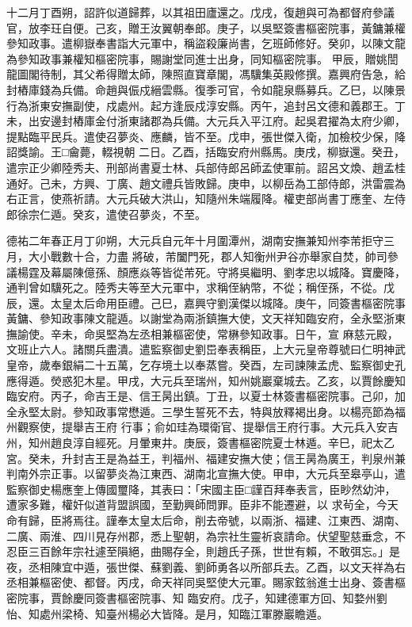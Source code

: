 \begin{pinyinscope}
 十二月丁酉朔，詔許似道歸葬，以其祖田廬還之。戊戌，復趙與可為都督府參議官，放李玨自便。己亥，贈王汝翼朝奉郎。庚子，以吳堅簽書樞密院事，黃鏞兼權參知政事。遣柳嶽奉書詣大元軍中，稱盜殺廉尚書，乞班師修好。癸卯，以陳文龍為參知政事兼權知樞密院事，賜謝堂同進士出身，同知樞密院事。
 甲辰，贈姚誾龍圖閣待制，其父希得贈太師，陳照直寶章閣，馮驥集英殿修撰。嘉興府告急，給封樁庫錢為兵備。命趙與侲戍縉雲縣。復季可官，令如龍泉縣募兵。乙巳，以陳景行為浙東安撫副使，戍處州。起方逢辰戍淳安縣。丙午，追封呂文德和義郡王。丁未，出安邊封樁庫金付浙東諸郡為兵備。大元兵入平江府。起吳君擢為太府少卿，提點臨平民兵。遣使召夢炎、應麟，皆不至。戊申，張世傑入衛，加檢校少保，降詔獎諭。王□龠薨，輟視朝
 二日。乙酉，括臨安府州縣馬。庚戌，柳嶽還。癸丑，遣宗正少卿陸秀夫、刑部尚書夏士林、兵部侍郎呂師孟使軍前。詔呂文煥、趙孟桂通好。己未，方興、丁廣、趙文禮兵皆敗歸。庚申，以柳岳為工部侍郎，洪雷震為右正言，使燕祈請。大元兵破大洪山，知隨州朱端履降。權吏部尚書丁應奎、左侍郎徐宗仁遁。癸亥，遣使召夢炎，不至。



 德祐二年春正月丁卯朔，大元兵自元年十月圍潭州，湖南安撫兼知州李芾拒守三月，大小戰數十合，力盡
 將破，芾闔門死，郡人知衡州尹谷亦舉家自焚，帥司參議楊霆及幕屬陳億孫、顏應焱等皆從芾死。守將吳繼明、劉孝忠以城降。寶慶降，通判曾如驥死之。陸秀夫等至大元軍中，求稱侄納幣，不從；稱侄孫，不從。戊辰，還。太皇太后命用臣禮。己巳，嘉興守劉漢傑以城降。庚午，同簽書樞密院事黃鏞、參知政事陳文龍遁。以謝堂為兩浙鎮撫大使，文天祥知臨安府，全永堅浙東撫諭使。辛未，命吳堅為左丞相兼樞密使，常楙參知政事。日午，宣
 麻慈元殿，文班止六人。諸關兵盡潰。遣監察御史劉岊奉表稱臣，上大元皇帝尊號曰仁明神武皇帝，歲奉銀絹二十五萬，乞存境土以奉蒸嘗。癸酉，左司諫陳孟虎、監察御史孔應得遁。熒惑犯木星。甲戌，大元兵至瑞州，知州姚巖棄城去。乙亥，以賈餘慶知臨安府。丙子，命吉王是、信王昺出鎮。丁丑，以夏士林簽書樞密院事。己卯，加全永堅太尉。參知政事常懋遁。三學生誓死不去，特與放釋褐出身。以楊亮節為福州觀察使，提舉吉王府
 行事；俞如珪為環衛官、提舉信王府行事。大元兵入安吉州，知州趙良淳自經死。月暈東井。庚辰，簽書樞密院夏士林遁。辛巳，祀太乙宮。癸未，升封吉王是為益王，判福州、福建安撫大使；信王昺為廣王，判泉州兼判南外宗正事。以留夢炎為江東西、湖南北宣撫大使。甲申，大元兵至皋亭山，遣監察御史楊應奎上傳國璽降，其表曰：「宋國主臣□謹百拜奉表言，臣眇然幼沖，遭家多難，權奸似道背盟誤國，至勤興師問罪。臣非不能遷避，以
 求茍全，今天命有歸，臣將焉往。謹奉太皇太后命，削去帝號，以兩浙、福建、江東西、湖南、二廣、兩淮、四川見存州郡，悉上聖朝，為宗社生靈祈哀請命。伏望聖慈垂念，不忍臣三百餘年宗社遽至隕絕，曲賜存全，則趙氏子孫，世世有賴，不敢弭忘。」是夜，丞相陳宜中遁，張世傑、蘇劉義、劉師勇各以所部兵去。乙酉，以文天祥為右丞相兼樞密使、都督。丙戌，命天祥同吳堅使大元軍。賜家鉉翁進士出身、簽書樞密院事，賈餘慶同簽書樞密院事、知
 臨安府。戊子，知建德軍方回、知婺州劉怡、知處州梁椅、知臺州楊必大皆降。是月，知臨江軍滕巖瞻遁。




\end{pinyinscope}
